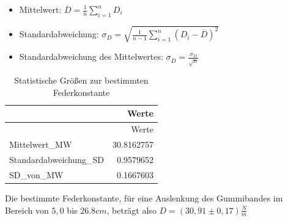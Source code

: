 \documentclass[
  9pt,
]{article}
\newenvironment{Shaded}{\begin{snugshade}}{\end{snugshade}}
\newcommand{\AttributeTok}[1]{\textcolor[rgb]{0.77,0.63,0.00}{#1}}
\newcommand{\CommentTok}[1]{\textcolor[rgb]{0.56,0.35,0.01}{\textit{#1}}}
\newcommand{\FloatTok}[1]{\textcolor[rgb]{0.00,0.00,0.81}{#1}}
\newcommand{\FunctionTok}[1]{\textcolor[rgb]{0.00,0.00,0.00}{#1}}
\newcommand{\NormalTok}[1]{#1}
\newcommand{\OtherTok}[1]{\textcolor[rgb]{0.56,0.35,0.01}{#1}}
\newcommand{\SpecialCharTok}[1]{\textcolor[rgb]{0.00,0.00,0.00}{#1}}
\newcommand{\StringTok}[1]{\textcolor[rgb]{0.31,0.60,0.02}{#1}}
\providecommand{\tightlist}{%
  \setlength{\itemsep}{0pt}\setlength{\parskip}{0pt}}
\begin{document}
\begin{itemize}
\tightlist
\item
  Mittelwert: \(\overline{D} = \frac{1}{n}\sum \limits_{i=1}^nD_i\)
\item
  Standardabweichung:
  \(\sigma_D = \sqrt{\frac{1}{n-1} \sum_{i=1}^n (D_i - \overline{D})^2}\)
\item
  Standardabweichung des Mittelwertes:
  \(\sigma_{\overline{D}}=\frac{\sigma_D}{\sqrt{n}}\)
\end{itemize}

\begin{Shaded}
\end{Shaded}

\begin{longtable}[]{@{}lr@{}}
\caption{Statistische Größen zur bestimmten
Federkonstante}\tabularnewline
\toprule()
& Werte \\
\midrule()
\endfirsthead
\toprule()
& Werte \\
\midrule()
\endhead
Mittelwert\_MW & 30.8162757 \\
Standardabweichung\_SD & 0.9579652 \\
SD\_von\_MW & 0.1667603 \\
\bottomrule()
\end{longtable}

Die bestimmte Federkonstante, für eine Auslenkung des Gummibandes im
Bereich von \(5,0\) bis \(26.8cm\), beträgt also
\(D=(30,91\pm 0,17)\frac{N}{m}\)
\end{document}
